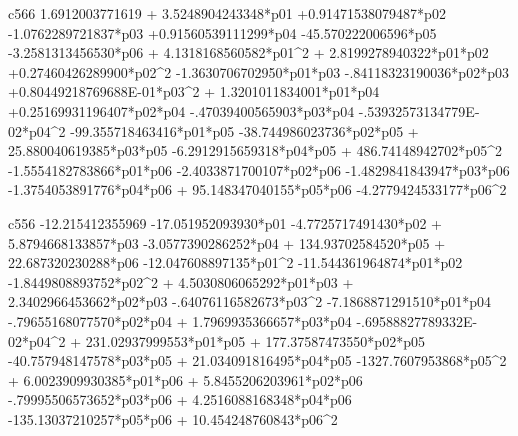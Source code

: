  c566
   1.6912003771619 + 3.5248904243348*p01 +0.91471538079487*p02  -1.0762289721837*p03 +0.91560539111299*p04  -45.570222006596*p05  -3.2581313456530*p06 + 4.1318168560582*p01^2 + 2.8199278940322*p01*p02 +0.27460426289900*p02^2  -1.3630706702950*p01*p03  -.84118323190036*p02*p03 +0.80449218769688E-01*p03^2 + 1.3201011834001*p01*p04 +0.25169931196407*p02*p04  -.47039400565903*p03*p04  -.53932573134779E-02*p04^2  -99.355718463416*p01*p05  -38.744986023736*p02*p05 + 25.880040619385*p03*p05  -6.2912915659318*p04*p05 + 486.74148942702*p05^2  -1.5554182783866*p01*p06  -2.4033871700107*p02*p06  -1.4829841843947*p03*p06  -1.3754053891776*p04*p06 + 95.148347040155*p05*p06  -4.2779424533177*p06^2 
  
 c556
  -12.215412355969  -17.051952093930*p01  -4.7725717491430*p02 + 5.8794668133857*p03  -3.0577390286252*p04 + 134.93702584520*p05 + 22.687320230288*p06  -12.047608897135*p01^2  -11.544361964874*p01*p02  -1.8449808893752*p02^2 + 4.5030806065292*p01*p03 + 2.3402966453662*p02*p03  -.64076116582673*p03^2  -7.1868871291510*p01*p04  -.79655168077570*p02*p04 + 1.7969935366657*p03*p04  -.69588827789332E-02*p04^2 + 231.02937999553*p01*p05 + 177.37587473550*p02*p05  -40.757948147578*p03*p05 + 21.034091816495*p04*p05  -1327.7607953868*p05^2 + 6.0023909930385*p01*p06 + 5.8455206203961*p02*p06  -.79995506573652*p03*p06 + 4.2516088168348*p04*p06  -135.13037210257*p05*p06 + 10.454248760843*p06^2 
  
